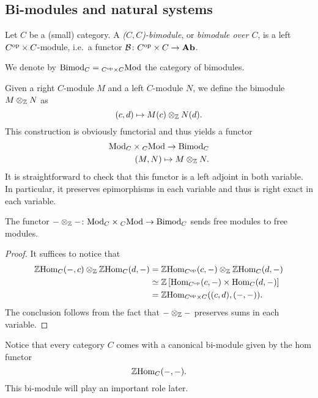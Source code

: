 \documentclass{amsart}
\newcommand{\B}{\mathcal{B}}
\newcommand{\Bimod}[1]{\mathrm{Bimod}_{#1}}
\renewcommand{\homset}[3]{\mathrm{Hom}_{#1}(#2,#3)}
\begin{document}
\subsection{Bi-modules and natural systems}
\begin{definition}
  Let $C$ be a (small) category. A \emph{($C,C$)\nbd-bimodule}, or
  \emph{bimodule over $C$}, is a left $C^{{\mathrm{op}}} \times C$\nbd-module,
  i.e.\ a functor $\B \colon C^{\op} \times C \to \Ab$.

  \end{definition}
  We denote by
  $\Bimod{C}=\LMod{C^{\op}\times C}$ the category of bimodules.
\begin{paragr}
  Given a right $C$\nbd-module $M$ and a left $C$\nbd-module $N$, we
  define the bimodule $M\otimes_{\mathbb Z}N$ as 
  \[
    (c,d) \mapsto M(c)\otimes_{\mathbb Z} N(d).
  \]
  This construction is obviously functorial and thus yields a functor
  \[
    \begin{aligned}
      \RMod{C}\times \LMod{C} \to \Bimod{C}\\
      (M,N) \mapsto M\tens{\Z} N.
    \end{aligned}
  \]
  It is straightforward to check that this functor is a left adjoint
  in both variable. In particular, it preserves epimorphisms in each
  variable and thus is right exact in each variable. 
\end{paragr}
\begin{lemma}\label{tensfreemod}
  The functor $-\tens{\Z}- \colon\RMod{C}\times \LMod{C} \to
  \Bimod{C}$ sends free modules to free modules.
\end{lemma}
\begin{proof}
  It suffices to notice that
  \[
    \begin{aligned}
      \Z\homset{C}{-}{c}\tens{\Z}\Z\homset{C}{d}{-}&=\Z\homset{C^{\op}}{c}{-}\tens{\Z}\Z\homset{C}{d}{-}\\
                                                   &\simeq\Z\left[\homset{C^{\op}}{c}{-}\times\homset{C}{d}{-}\right]\\
      &=\Z\homset{C^{\op}\times C}{(c,d)}{(-,-)}.      
    \end{aligned}
  \]
  The conclusion follows from the fact that $-\otimes_{\mathbb Z}-$ preserves
  sums in each variable. 
\end{proof}
\begin{paragr}
  Notice that every category $C$ comes with a canonical bi-module
  given by the hom functor
  \[
    \Z \homset{C}{-}{-}.
  \]
  This bi-module will play an important role later.
\end{paragr}
\end{document}
